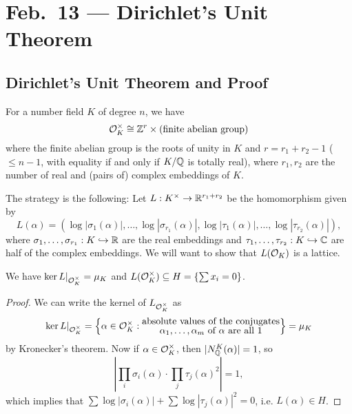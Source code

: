 \chapter{Feb.~13 --- Dirichlet's Unit Theorem}

\section{Dirichlet's Unit Theorem and Proof}

\begin{theorem}\label{thm:dirichlet-unit}
  For a number field $K$ of degree $n$, we have
  \[
    \mathcal{O}_K^\times \cong \mathbb{Z}^{r} \times (\text{finite abelian group})
  \]
  where the finite abelian group is the roots of unity in $K$
  and $r = r_1 + r_2 - 1$ ($\le n - 1$, with equality if and
  only if $K / \mathbb{Q}$ is totally real), where $r_1, r_2$
  are the number of real and (pairs of) complex embeddings
  of $K$.
\end{theorem}

\begin{remark}
  The strategy is the following: Let $L : K^\times \to \mathbb{R}^{r_1 + r_2}$ be the
  homomorphism given by
  \[
    L(\alpha) = (\log |\sigma_1(\alpha)|, \ldots, \log |\sigma_{r_1}(\alpha)|, \log |\tau_1(\alpha)|, \ldots, \log |\tau_{r_2}(\alpha)|),
  \]
  where $\sigma_1, \dots, \sigma_{r_1} : K \hookrightarrow \mathbb{R}$
  are the real embeddings and $\tau_1, \dots, \tau_{r_2} : K \hookrightarrow \mathbb{C}$
  are half of the complex embeddings. We will want
  to show that $L(\mathcal{O}_K)$ is a lattice.
\end{remark}

\begin{lemma}\label{lem:kernel}
  We have $\ker L|_{\mathcal{O}_K^\times} = \mu_K$
  and $L(\mathcal{O}_K^\times) \subseteq H = \{\sum x_i = 0\}$.
\end{lemma}

\begin{proof}
  We can write the kernel of $L_{\mathcal{O}_K^\times}$ as
  \[
  \ker L|_{\mathcal{O}_K^\times} = \left\{\alpha \in \mathcal{O}_K^\times : \substack{\displaystyle\text{absolute values of the conjugates} \\ \displaystyle\text{$\alpha_1, \dots, \alpha_m$ of $\alpha$ are all $1$}}\right\}
    = \mu_K
  \]
  by Kronecker's theorem. Now if $\alpha \in \mathcal{O}_K^\times$,
  then $|N^K_{\mathbb{Q}} (\alpha)| = 1$, so
  \[
    \left| \prod_i \sigma_i(\alpha) \cdot \prod_j \tau_j(\alpha)^2 \right| = 1,
  \]
  which implies that $\sum \log |\sigma_i(\alpha)| + \sum \log |\tau_j(\alpha)|^2 = 0$, i.e.
  $L(\alpha) \in H$.
\end{proof}

